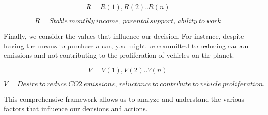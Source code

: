 \documentclass{article}
\begin{document}
	\[ 
	R= {R(1), R(2)..R(n)} 
	\]
	
	\[ 
	R= Stable \ monthly\ income, \ parental \ support, \ ability\  to \ work
	\]

Finally, we consider the values that influence our decision. For instance, despite having the means to purchase a car, you might be committed to reducing carbon emissions and not contributing to the proliferation of vehicles on the planet.

	\[ 
	V= {V(1), V(2)..V(n)} 
	\]
	
	\[ 
	V= Desire \ to \ reduce \ CO2 \ emissions, \ reluctance \ to \ contribute \ to \ vehicle \ proliferation. 
	\]

This comprehensive framework allows us to analyze and understand the various factors that influence our decisions and actions.
\end{document}

